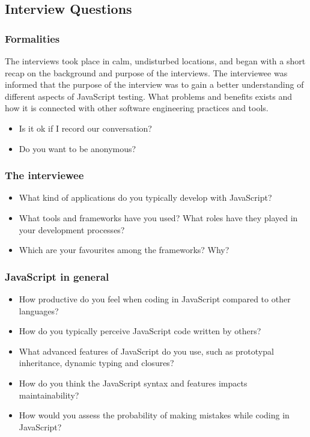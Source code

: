 \documentclass[11pt]{article}
\begin{document}
\subsection{Interview Questions}

\subsubsection{Formalities}
The interviews took place in calm, undisturbed locations, and began with a short recap on the background and purpose of the interviews. The interviewee was informed that the purpose of the interview was to gain a better understanding of different aspects of JavaScript testing. What problems and benefits exists and how it is connected with other software engineering practices and tools.

\begin{itemize}
\item Is it ok if I record our conversation?
\item Do you want to be anonymous?
\end{itemize}

\subsubsection{The interviewee}
\begin{itemize}
\item What kind of applications do you typically develop with JavaScript?
\item What tools and frameworks have you used? What roles have they played in your development processes?
\item Which are your favourites among the frameworks? Why?
\end{itemize}

\subsubsection{JavaScript in general}
\begin{itemize}
\item How productive do you feel when coding in JavaScript compared to other languages?
\item How do you typically perceive JavaScript code written by others?
\item What advanced features of JavaScript do you use, such as prototypal inheritance, dynamic typing and closures?
\item How do you think the JavaScript syntax and features impacts maintainability?
\item How would you assess the probability of making mistakes while coding in JavaScript?
\end{itemize}
\end{document}
